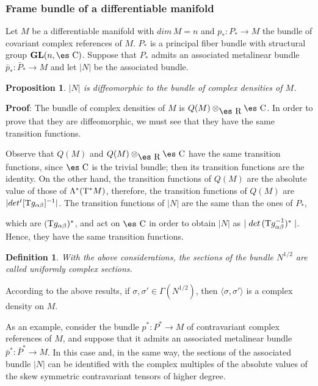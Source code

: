 \documentclass[12pt]{article}
\theoremstyle{plain}
\newtheorem{prop}{Proposition}
\newtheorem{definition}{Definition}
\def\qed{\ifvmode\removelastskip\fi
{\unskip\nobreak\hfil\penalty50\hbox{}\nobreak\hfil
\hbox{\vrule height1.2ex width1.2ex}\parfillskip=0pt
\finalhyphendemerits=0 \par\smallskip}}
\def\GL{{\bf GL}(n,\Complex )}
\def\Real{\mbox{\es R}}
\def\Complex{\mbox{\es C}}
\def\Tan{{\rm T}}
\begin{document}
\subsubsection{Frame bundle of a differentiable manifold}


Let $M$ be a differentiable manifold with $dim\, M = n$ and
$p_* \colon P_* \to M$ the bundle of covariant complex references of
$M$.
$P_*$ is a principal fiber bundle with structural group $\GL$.
Suppose that $P_*$ admits an associated metalinear bundle
$\bar p_* \colon \bar P_* \to M$ and let $| N |$ be the associated
bundle.

\begin{prop}
$| N |$ is diffeomorphic to the bundle of complex densities of $M$.
\end{prop}
{\bf Proof}: 
The bundle of complex densities  of $M$ is $Q(M) \otimes_{\Real}
\Complex$.
In order to prove that they are diffeomorphic, we must see that they
have the
same transition functions.

Observe that $Q(M)$ and $Q(M) \otimes_{\Real} \Complex$
have the same transition functions, since $\Complex$ is the trivial
bundle;
then its transition functions are the identity.
On the other hand, the transition functions of $Q(M)$
are the absolute value of those of $\Lambda^*(\Tan^*M)$,
therefore, the transition functions of $Q(M)$ are $| det ^t[\Tan
g_{\alpha \beta }]^{-1} |$.
The transition functions of $| N |$ are the same than the ones of $P_*$,

which are $(\Tan g_{\alpha \beta })^*$,
and act on $\Complex$ in order to obtain $| N |$ as
$\mid det\, (\Tan g_{\alpha \beta }^{-1})^*\mid$. Hence, they have the
same transition functions.
\qed

\begin{definition}
With the above considerations, the sections of the bundle $N^{1/2}$
are called {\rm uniformly complex sections}.
\end{definition}

According to the above results, if $\sigma , \sigma '\in \Gamma
(N^{1/2})$,
then $\langle \sigma ,\sigma ' \rangle$ is a complex density on $M$.

As an example, consider the bundle $p^* \colon P^* \to M$
of contravariant complex references of $M$,
and suppose that it admits an associated metalinear bundle
$\bar p^* \colon \bar P^* \to M$. In this case and,
in the same way, the sections of the associated bundle
$| N |$ can be identified with the complex multiples
of the absolute values of the skew symmetric contravariant tensors of
higher degree.
\end{document}
